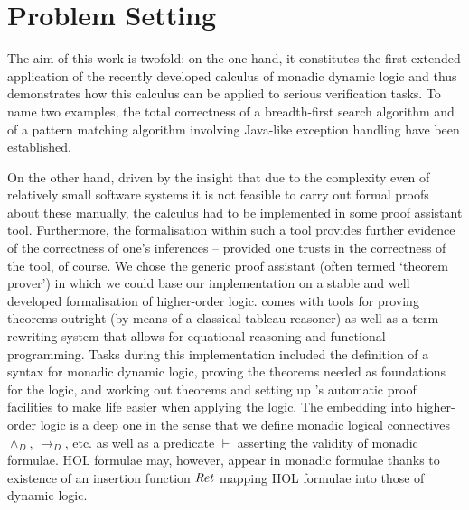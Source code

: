 \section{Problem Setting}
\label{sec:problem-setting}
The aim of this work is twofold: on the one hand, it constitutes the first
extended application of the recently developed calculus of monadic dynamic logic
 and thus demonstrates how this calculus can be
applied to serious verification tasks. To name two examples, the total
correctness of a breadth-first search algorithm and of a pattern matching
algorithm involving Java-like exception handling have been established. 

On the other hand, driven by the insight that due to the complexity even of
relatively small software systems it is not feasible to carry out formal proofs
about these manually, the calculus had to be implemented in some proof assistant
tool. Furthermore, the formalisation within such a tool provides further
evidence of the correctness of one's inferences -- provided one trusts in the
correctness of the tool, of course.  We chose the generic proof assistant (often
termed `theorem prover') \IsabelleHOL in which we could base our implementation
on a stable and well developed formalisation of higher-order logic. \IsabelleHOL
comes with tools for proving theorems outright (by means of a classical tableau
reasoner) as well as a term rewriting system that allows for equational
reasoning and functional programming. Tasks during this implementation included
the definition of a syntax for monadic dynamic logic, proving the theorems
needed as foundations for the logic, and working out theorems and setting up
\Isabelle's automatic proof facilities to make life easier when applying the
logic. The embedding into higher-order logic is a deep one in the sense that we
define monadic logical connectives $\land_D$, $\longrightarrow_D$, etc. as well
as a predicate $\vdash$ asserting the validity of monadic formulae. HOL formulae
may, however, appear in monadic formulae thanks to existence of an insertion
function $\mathit{Ret}$ mapping HOL formulae into those of dynamic logic.

